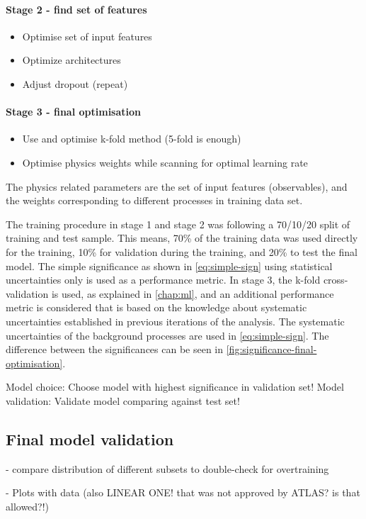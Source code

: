 \paragraph{Stage 2 - find set of features}
\begin{itemize}
    \item Optimise set of input features
    \item Optimize architectures
    \item Adjust dropout (repeat)
\end{itemize}

\paragraph{Stage 3 - final optimisation}
\begin{itemize}
    \item Use and optimise k-fold method (5-fold is enough)
    \item Optimise physics weights while scanning for optimal learning rate
\end{itemize}

The physics related parameters are the set of input features (observables), and the weights corresponding to different processes in training data set. 

The training procedure in stage 1 and stage 2 was following a 70/10/20 split of training and test sample. This means, 70\% of the training data was used directly for the training, 10\% for validation during the training, and 20\% to test the final model. The simple significance as shown in \cref{eq:simple-sign} using statistical uncertainties only is used as a performance metric.
In stage 3, the k-fold cross-validation is used, as explained in \cref{chap:ml}, and an additional performance metric is considered that is based on the knowledge about systematic uncertainties established in previous iterations of the analysis. The systematic uncertainties of the background processes are used in \cref{eq:simple-sign}. The difference between the significances can be seen in \cref{fig:significance-final-optimisation}.

Model choice: Choose model with highest significance in validation set!
Model validation: Validate model comparing against test set!




\subsection{Final model validation}

- compare distribution of different subsets to double-check for overtraining

- Plots with data (also LINEAR ONE! that was not approved by ATLAS? is that allowed?!)


